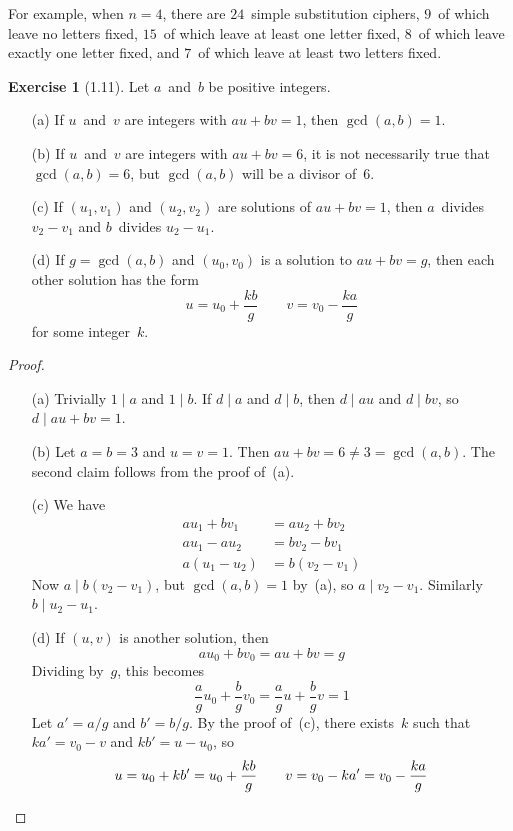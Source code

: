\documentclass[letterpaper,12pt]{article}
\newcommand{\divides}{\mathrel{|}}
\theoremstyle{definition}
\newtheorem*{exer}{Exercise}
\begin{document}
\noindent For example, when \(n=4\), there are \(24\)~simple substitution ciphers, \(9\)~of which leave no letters fixed, \(15\)~of which leave at least one letter fixed, \(8\)~of which leave exactly one letter fixed, and \(7\)~of which leave at least two letters fixed.

\begin{exer}[1.11]
Let \(a\)~and~\(b\) be positive integers.
\begin{enumerate}[itemsep=0pt]
\item[(a)] If \(u\)~and~\(v\) are integers with \(au+bv=1\), then \(\gcd(a,b)=1\).
\item[(b)] If \(u\)~and~\(v\) are integers with \(au+bv=6\), it is not necessarily true that \(\gcd(a,b)=6\), but \(\gcd(a,b)\) will be a divisor of~\(6\).
\item[(c)] If \((u_1,v_1)\) and \((u_2,v_2)\) are solutions of \(au+bv=1\), then \(a\)~divides \(v_2-v_1\) and \(b\)~divides \(u_2-u_1\).
\item[(d)] If \(g=\gcd(a,b)\) and \((u_0,v_0)\) is a solution to \(au+bv=g\), then each other solution has the form
\[u=u_0+\frac{kb}{g}\qquad v=v_0-\frac{ka}{g}\]
for some integer~\(k\).
\end{enumerate}
\end{exer}
\begin{proof}
\begin{enumerate}[itemsep=0pt]
\item[(a)] Trivially \(1\divides a\) and \(1\divides b\). If \(d\divides a\) and \(d\divides b\), then \(d\divides au\) and \(d\divides bv\), so \(d\divides au+bv=1\).
\item[(b)] Let \(a=b=3\) and \(u=v=1\). Then \(au+bv=6\ne 3=\gcd(a,b)\). The second claim follows from the proof of~(a).
\item[(c)] We have
\begin{align*}
au_1+bv_1&=au_2+bv_2\\
au_1-au_2&=bv_2-bv_1\\
a(u_1-u_2)&=b(v_2-v_1)
\end{align*}
Now \(a\divides b(v_2-v_1)\), but \(\gcd(a,b)=1\) by~(a), so \(a\divides v_2-v_1\). Similarly \(b\divides u_2-u_1\).
\item[(d)] If \((u,v)\) is another solution, then
\[au_0+bv_0=au+bv=g\]
Dividing by~\(g\), this becomes
\[\frac{a}{g}u_0+\frac{b}{g}v_0=\frac{a}{g}u+\frac{b}{g}v=1\]
Let \(a'=a/g\) and \(b'=b/g\). By the proof of~(c), there exists~\(k\) such that \(ka'=v_0-v\) and \(kb'=u-u_0\), so
\[u=u_0+kb'=u_0+\frac{kb}{g}\qquad v=v_0-ka'=v_0-\frac{ka}{g}\qedhere\]
\end{enumerate}
\end{proof}
\end{document}
